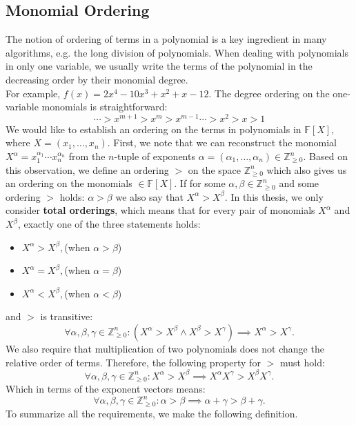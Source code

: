 \documentclass[thesis=M,english]{FITthesis}[2012/10/20]
\theoremstyle{remark}
\theoremstyle{definition}
\begin{document}
\subsection{Monomial Ordering}
\noindent The notion of ordering of terms in a polynomial is a key ingredient in many algorithms, e.g. the long division of polynomials. When dealing with polynomials in only one variable, we usually write the terms of the polynomial in the decreasing order by their monomial degree. \\
\noindent For example, ${f(x) = 2x^4 - 10x^3 + x^2 + x -12}$. The degree ordering on the one-variable monomials is straightforward:
$$
\cdots > x^{m+1} > x^m > x^{m-1} \cdots > x^2 > x > 1
$$
We would like to establish an ordering on the terms in polynomials in $\mathbb{F}[X],$ where $X = (x_1, \ldots, x_n)$. First, we note that we can reconstruct the monomial $X^{\alpha} = x_1^{\alpha_1}\cdots x_n^{\alpha_n}$ from the $n$-tuple of exponents $\alpha = (\alpha_1,\ldots, \alpha_n) \in \mathbb{Z}_{\geq 0}^n.$ Based on this observation, we define an ordering $>$ on the space $\mathbb{Z}_{\geq 0}^n$ which also gives us an ordering on the monomials $\in \mathbb{F}[X].$ If for some $\alpha, \beta \in  \mathbb{Z}_{\geq 0}^n$ and some ordering $>$ holds: $\alpha > \beta$ we also say that $X^\alpha > X^\beta.$ In this thesis, we only consider \textbf{total orderings}, which means that for every pair of monomials $X^\alpha$ and $X^\beta$, exactly one of the three statements holds:
\begin{itemize}
\item $X^\alpha > X^\beta,$\hfill (when $\alpha > \beta$)
\item $X^\alpha = X^\beta,$\hfill (when $\alpha = \beta$)
\item $X^\alpha < X^\beta,$\hfill (when $\alpha < \beta$)
\end{itemize}
\noindent and $>$ is transitive:
$$
\forall \alpha, \beta, \gamma \in \mathbb{Z}_{\geq 0}^n: (X^\alpha > X^\beta \land X^\beta > X^\gamma) \implies X^\alpha > X^\gamma.
$$
\noindent We also require that multiplication of two polynomials does not change the relative order of terms. Therefore, the following property for $>$ must hold:
$$
\forall \alpha, \beta, \gamma \in \mathbb{Z}_{\geq 0}^n: X^\alpha > X^\beta \implies X^\alpha X^\gamma > X^\beta X^\gamma.
$$
\noindent Which in terms of the exponent vectors means: 
$$
\forall \alpha, \beta, \gamma \in \mathbb{Z}_{\geq 0}^n: \alpha > \beta \implies \alpha + \gamma > \beta + \gamma.
$$
\noindent To summarize all the requirements, we make the following definition.
\end{document}
